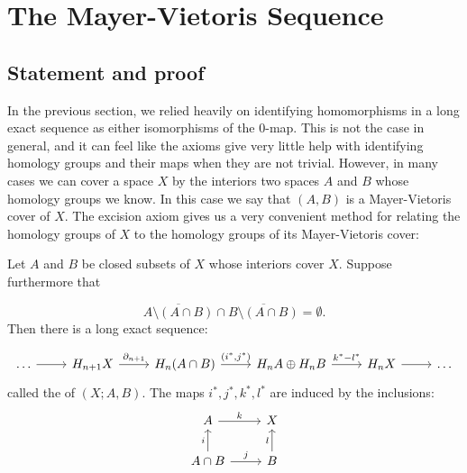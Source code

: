 \section{The Mayer-Vietoris Sequence}\label{sec-mayer-vietoris}
\subsection{Statement and proof}
In the previous section, we relied heavily on identifying homomorphisms in a long exact sequence as either isomorphisms of the $0$-map. This is not the case in general, and it can feel like the axioms give very little help with identifying homology groups and their maps when they are not trivial. However, in many cases we can cover a space $X$ by the interiors two spaces $A$ and $B$ whose homology groups we know. In this case we say that $(A,B)$ is a Mayer-Vietoris cover of $X$. The excision axiom gives us a very convenient method for relating the homology groups of $X$ to the homology groups of its Mayer-Vietoris cover:

\begin{theorem}\label{mayer-vietoris}
Let $A$ and $B$ be closed subsets of $X$ whose interiors cover $X$. Suppose furthermore that  


$$\overline{A\setminus(A\cap B)}\cap \overline{B\setminus(A\cap B)}=\emptyset.$$
Then there is a long exact sequence:

\[\begin{tikzcd}
\dots \arrow[r] & H_{n+1}X \arrow[r, "\partial_{n+1}"] & H_n(A\cap B) \arrow[r, "{(i^*,j^*)}"] & H_n A \dsum H_n B \arrow[r, "k^*-l^*"] & H_n X \arrow[r] & \dots
\end{tikzcd}\]
called the  of $(X;A,B)$. The maps $i^*,j^*,k^*,l^*$ are induced by the inclusions:
\[\begin{tikzcd}
A \arrow[r, "k"]                      & X                \\
A\cap B \arrow[u, "i"] \arrow[r, "j"] & B \arrow[u, "l"]
\end{tikzcd}\]
\end{theorem}


